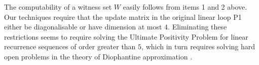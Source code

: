 The computability of a witness set $W$ easily follows from items 1 and
2 above. Our techniques require that the update matrix in the
original linear loop \textsf{P1} either be diagonalisable or have
dimension at most $4$.  Eliminating these restrictions seems to
require solving the Ultimate Positivity Problem for linear recurrence
sequences of order greater than $5$, which in turn requires solving
hard open problems in the theory of Diophantine approximation
\cite{OW14:SODA}.
